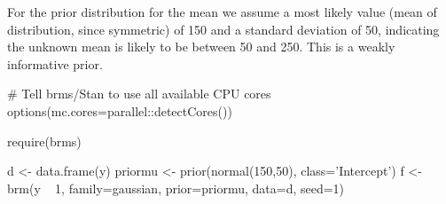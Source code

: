 For the prior distribution for the mean we assume a most likely value (mean of distribution, since symmetric) of 150 and a standard deviation of 50, indicating the unknown mean is likely to be between 50 and 250.   This is a weakly informative prior.

\begin{Schunk}
\begin{Sinput}
# Tell brms/Stan to use all available CPU cores
options(mc.cores=parallel::detectCores())
\end{Sinput}
\end{Schunk}

\begin{Schunk}
\begin{Sinput}
require(brms)
\end{Sinput}
\begin{Sinput}
d <- data.frame(y)
priormu <- prior(normal(150,50), class='Intercept')
f <- brm(y ~ 1, family=gaussian, prior=priormu, data=d, seed=1)
\end{Sinput}
\end{Schunk}

